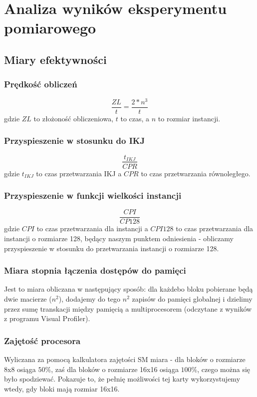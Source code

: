 \documentclass[10pt,a4paper]{article}
\begin{document}
\section{Analiza wyników eksperymentu pomiarowego}
\subsection{Miary efektywności}
\subsubsection*{Prędkość obliczeń}
\begin{equation}
	\frac{ZL}{t} = \frac{2 * n^3}{t}
\end{equation}
gdzie $ZL$ to złożoność obliczeniowa, $t$ to czas, a $n$ to rozmiar instancji.

\subsubsection*{Przyspieszenie w stosunku do IKJ}
\begin{equation}
	\frac{t_{IKJ}}{CPR}
\end{equation}
gdzie $t_{IKJ}$ to czas przetwarzania IKJ a $CPR$ to czas przetwarzania równoległego.

\subsubsection*{Przyspieszenie w funkcji wielkości instancji}
\begin{equation}
	\frac{CPI}{CP 128}
\end{equation}
gdzie $CPI$ to czas przetwarzania dla instancji a $CPI 128$ to czas przetwarzania dla
instancji o rozmiarze 128, będący naszym punktem odniesienia - obliczamy przyspieszenie
w stosunku do przetwarzania instancji o rozmiarze 128.

\subsubsection*{Miara stopnia łączenia dostępów do pamięci}
Jest to miara obliczana w następujący sposób: dla każdebo bloku pobierane
będą dwie macierze ($n^2$), dodajemy do tego $n^2$ zapisów do pamięci globalnej
i dzielimy przez sumę transkacji między pamięcią a multiprocesorem (odczytane
z wyników z programu Visual Profiler).\\

\subsubsection*{Zajętość procesora}
Wyliczana za pomocą kalkulatora zajętości SM miara - dla bloków o rozmiarze
8x8 osiąga $50\%$, zaś dla bloków o rozmiarze 16x16 osiąga $100\%$, czego można
się było spodziewać. Pokazuje to, że pełnię możliwości tej karty wykorzystujemy
wtedy, gdy bloki mają rozmiar 16x16.
\end{document}
